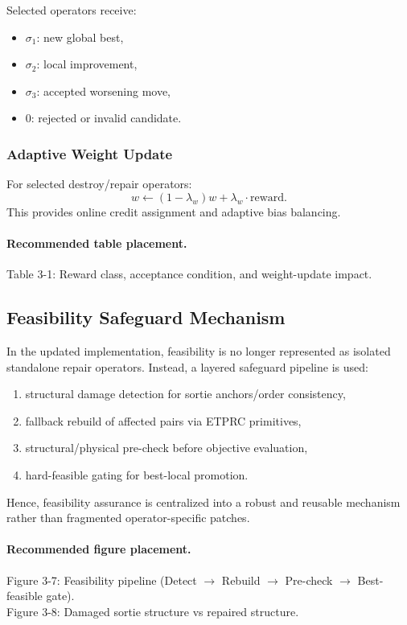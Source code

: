 \documentclass[review,12pt]{elsarticle}
\begin{document}
Selected operators receive:
\begin{itemize}
  \item \(\sigma_1\): new global best,
  \item \(\sigma_2\): local improvement,
  \item \(\sigma_3\): accepted worsening move,
  \item \(0\): rejected or invalid candidate.
\end{itemize}

\subsubsection{Adaptive Weight Update}

For selected destroy/repair operators:
\begin{equation}
w \leftarrow (1-\lambda_w)w + \lambda_w\cdot \mathrm{reward}.
\label{eq:weight_update}
\end{equation}
This provides online credit assignment and adaptive bias balancing.

\paragraph{Recommended table placement.}
Table 3-1: Reward class, acceptance condition, and weight-update impact.

\subsection{Feasibility Safeguard Mechanism}
\label{subsec:feasibility}

In the updated implementation, feasibility is no longer represented as isolated standalone repair operators. Instead, a layered safeguard pipeline is used:
\begin{enumerate}
  \item structural damage detection for sortie anchors/order consistency,
  \item fallback rebuild of affected pairs via ETPRC primitives,
  \item structural/physical pre-check before objective evaluation,
  \item hard-feasible gating for best-local promotion.
\end{enumerate}
Hence, feasibility assurance is centralized into a robust and reusable mechanism rather than fragmented operator-specific patches.

\paragraph{Recommended figure placement.}
Figure 3-7: Feasibility pipeline (Detect \(\rightarrow\) Rebuild \(\rightarrow\) Pre-check \(\rightarrow\) Best-feasible gate).\\
Figure 3-8: Damaged sortie structure vs repaired structure.
\end{document}
